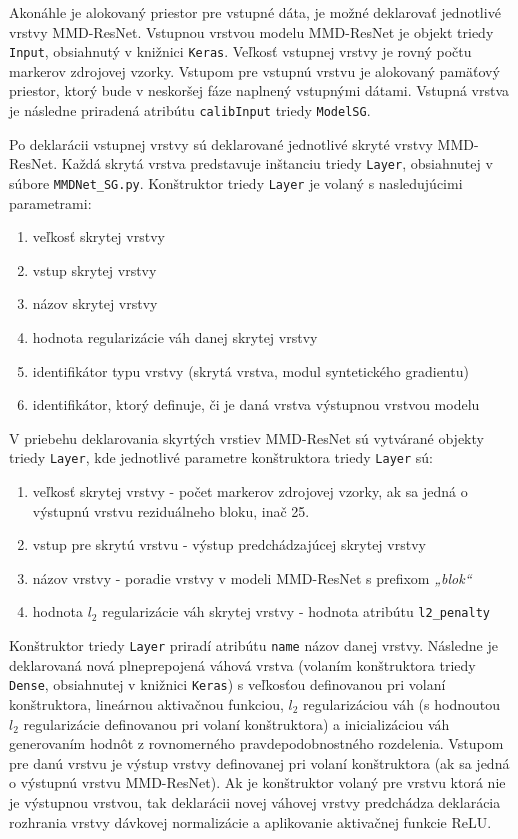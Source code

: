 Akonáhle je alokovaný priestor pre vstupné dáta, je možné deklarovať jednotlivé vrstvy MMD-ResNet. Vstupnou vrstvou modelu MMD-ResNet je objekt triedy \texttt{Input}, obsiahnutý v knižnici \texttt{Keras}. Veľkosť vstupnej vrstvy je rovný počtu markerov zdrojovej vzorky. Vstupom pre vstupnú vrstvu je alokovaný pamäťový priestor, ktorý bude v neskoršej fáze naplnený vstupnými dátami. Vstupná vrstva je následne priradená atribútu \texttt{calibInput} triedy \texttt{ModelSG}.

Po deklarácii vstupnej vrstvy sú deklarované jednotlivé skryté vrstvy MMD-ResNet. Každá skrytá vrstva predstavuje inštanciu triedy \texttt{Layer}, obsiahnutej v súbore \texttt{MMDNet_SG.py}. Konštruktor triedy \texttt{Layer} je volaný s nasledujúcimi parametrami:
\begin{enumerate}
    \item veľkosť skrytej vrstvy
    \item vstup skrytej vrstvy
    \item názov skrytej vrstvy
    \item hodnota regularizácie váh danej skrytej vrstvy
    \item identifikátor typu vrstvy (skrytá vrstva, modul syntetického gradientu)
    \item identifikátor, ktorý definuje, či je daná vrstva výstupnou vrstvou modelu
\end{enumerate}
V priebehu deklarovania skyrtých vrstiev MMD-ResNet sú vytvárané objekty triedy \texttt{Layer}, kde jednotlivé parametre konštruktora triedy \texttt{Layer} sú:
\begin{enumerate}
    \item veľkosť skrytej vrstvy - počet markerov zdrojovej vzorky, ak sa jedná o výstupnú vrstvu reziduálneho bloku, inač 25.
    \item vstup pre skrytú vrstvu - výstup predchádzajúcej skrytej vrstvy
    \item názov vrstvy - poradie vrstvy v modeli MMD-ResNet s prefixom \textit{„blok“}
    \item hodnota $l_2$ regularizácie váh skrytej vrstvy - hodnota atribútu \texttt{l2_penalty}
\end{enumerate}

Konštruktor triedy \texttt{Layer} priradí atribútu \texttt{name} názov danej vrstvy. Následne je deklarovaná nová plneprepojená váhová vrstva (volaním konštruktora triedy \texttt{Dense}, obsiahnutej v knižnici \texttt{Keras}) s veľkosťou definovanou pri volaní konštruktora, lineárnou aktivačnou funkciou, $l_2$ regularizáciou váh (s hodnoutou $l_2$ regularizácie definovanou pri volaní konštruktora) a inicializáciou váh generovaním hodnôt z rovnomerného pravdepodobnostného rozdelenia. Vstupom pre danú vrstvu je výstup vrstvy definovanej pri volaní konštruktora (ak sa jedná o výstupnú vrstvu MMD-ResNet). Ak je konštruktor volaný pre vrstvu ktorá nie je výstupnou vrstvou, tak deklarácii novej váhovej vrstvy predchádza deklarácia rozhrania vrstvy dávkovej normalizácie a aplikovanie aktivačnej funkcie ReLU. 


